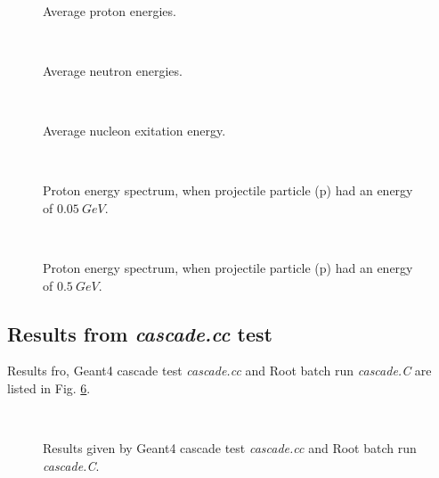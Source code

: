 \begin{figure}
  \begin{center}
    \leavevmode
    \mbox{\epsfxsize=8cm  }
       \caption{Average proton energies.}
  \label{pPbProtonEnergy}
  \end{center}
\end{figure}


\begin{figure}
  \begin{center}
    \leavevmode
    \mbox{\epsfxsize=8cm  }
       \caption{Average neutron energies.}
  \label{pPbNeutronEnergy}
  \end{center}
\end{figure}


\begin{figure}
  \begin{center}
    \leavevmode
    \mbox{\epsfxsize=8cm  }
       \caption{Average nucleon exitation energy.}
  \label{pPbNucleonExitation}
  \end{center}
\end{figure}


\begin{figure}
  \begin{center}
    \leavevmode
    \mbox{\epsfxsize=8cm  }
       \caption{Proton energy spectrum, when projectile particle (p) had an energy of $0.05~GeV$.}
  \label{p50MeVPbProtonEnergy}
  \end{center}
\end{figure}


\begin{figure}
  \begin{center}
    \leavevmode
    \mbox{\epsfxsize=8cm  }
       \caption{Proton energy spectrum, when projectile particle (p) had an energy of $0.5~GeV$.}
  \label{p500MeVPbProtonEnergy}
  \end{center}
\end{figure}


\subsection{Results from {\em cascade.cc} test}
Results fro, {\sc Geant4} cascade test {\em cascade.cc} and Root batch run {\em cascade.C} are listed in Fig. \ref{cascadeBatch}.

\begin{figure}
  \begin{center}
    \leavevmode
    \mbox{\epsfxsize=13cm  }
       \caption{ Results given by {\sc Geant4} cascade test {\em cascade.cc} and Root batch run {\em cascade.C}.}
  \label{cascadeBatch}
  \end{center}
\end{figure}



